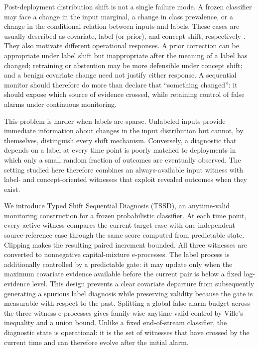 \documentclass[11pt,a4paper]{article}
\theoremstyle{definition}
\newcommand{\1}{\mathbf{1}}
\begin{document}
Post-deployment distribution shift is not a single failure mode. A frozen classifier may face a change in the input marginal, a change in class prevalence, or a change in the conditional relation between inputs and labels. These cases are usually described as covariate, label (or prior), and concept shift, respectively \cite{quinonero2009,moreno2012,gama2014,lu2019}. They also motivate different operational responses. A prior correction can be appropriate under label shift but inappropriate after the meaning of a label has changed; retraining or abstention may be more defensible under concept shift; and a benign covariate change need not justify either response. A sequential monitor should therefore do more than declare that ``something changed'': it should expose which source of evidence crossed, while retaining control of false alarms under continuous monitoring.

This problem is harder when labels are sparse. Unlabeled inputs provide immediate information about changes in the input distribution but cannot, by themselves, distinguish every shift mechanism. Conversely, a diagnostic that depends on a label at every time point is poorly matched to deployments in which only a small random fraction of outcomes are eventually observed. The setting studied here therefore combines an always-available input witness with label- and concept-oriented witnesses that exploit revealed outcomes when they exist.

We introduce Typed Shift Sequential Diagnosis (TSSD), an anytime-valid monitoring construction for a frozen probabilistic classifier. At each time point, every active witness compares the current target case with one independent source-reference case through the same score computed from predictable state. Clipping makes the resulting paired increment bounded. All three witnesses are converted to nonnegative capital-mixture e-processes. The label process is additionally controlled by a predictable gate: it may update only when the maximum covariate evidence available before the current pair is below a fixed log-evidence level. This design prevents a clear covariate departure from subsequently generating a spurious label diagnosis while preserving validity because the gate is measurable with respect to the past. Splitting a global false-alarm budget across the three witness e-processes gives family-wise anytime-valid control by Ville's inequality and a union bound. Unlike a fixed end-of-stream classifier, the diagnostic state is operational: it is the set of witnesses that have crossed by the current time and can therefore evolve after the initial alarm.
\end{document}
